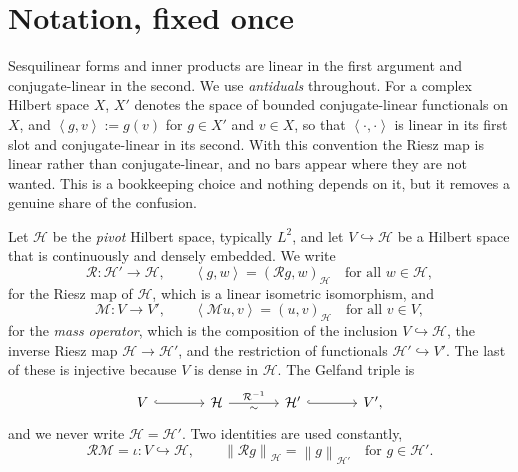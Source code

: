 \documentclass[11pt,a4paper]{article}
\theoremstyle{plain}
\newcommand{\norm}[1]{\left\|#1\right\|}
\newcommand{\dual}[2]{\left\langle #1, #2 \right\rangle}
\newcommand{\Hb}{\mathcal{H}}
\newcommand{\Vb}{V}
\newcommand{\Riesz}{\mathcal{R}}         %
\newcommand{\Mass}{\mathcal{M}}          %
\begin{document}
\section{Notation, fixed once}
\label{sec:notation}

Sesquilinear forms and inner products are linear in the first argument and
conjugate-linear in the second.  We use \emph{antiduals} throughout.  For a
complex Hilbert space $X$, $X'$ denotes the space of bounded conjugate-linear
functionals on $X$, and $\dual{g}{v} := g(v)$ for $g \in X'$ and $v \in X$, so
that $\dual{\cdot}{\cdot}$ is linear in its first slot and conjugate-linear in
its second.  With this convention the Riesz map is linear rather than
conjugate-linear, and no bars appear where they are not wanted.  This is a
bookkeeping choice and nothing depends on it, but it removes a genuine share of
the confusion.

Let $\Hb$ be the \emph{pivot} Hilbert space, typically $L^2$, and let $\Vb
\hookrightarrow \Hb$ be a Hilbert space that is continuously and densely
embedded.  We write
\begin{equation}
  \label{eq:riesz}
  \Riesz \colon \Hb' \to \Hb, \qquad \dual{g}{w} = (\Riesz g, w)_{\Hb}
  \quad \text{for all } w \in \Hb,
\end{equation}
for the Riesz map of $\Hb$, which is a linear isometric isomorphism, and
\begin{equation}
  \label{eq:mass}
  \Mass \colon \Vb \to \Vb', \qquad \dual{\Mass u}{v} = (u,v)_{\Hb}
  \quad \text{for all } v \in \Vb,
\end{equation}
for the \emph{mass operator}, which is the composition of the inclusion $\Vb
\hookrightarrow \Hb$, the inverse Riesz map $\Hb \to \Hb'$, and the restriction
of functionals $\Hb' \hookrightarrow \Vb'$.  The last of these is injective
because $\Vb$ is dense in $\Hb$.  The Gelfand triple is
\begin{equation}
  \label{eq:gelfand}
  \begin{tikzcd}[column sep=large]
    \Vb \arrow[r, hook] & \Hb \arrow[r, "\Riesz^{-1}", "\sim"'] & \Hb'
    \arrow[r, hook] & \Vb',
  \end{tikzcd}
\end{equation}
and we never write $\Hb = \Hb'$.  Two identities are used constantly,
\begin{equation}
  \label{eq:RM}
  \Riesz \Mass = \iota \colon \Vb \hookrightarrow \Hb, \qquad
  \norm{\Riesz g}_{\Hb} = \norm{g}_{\Hb'} \quad \text{for } g \in \Hb'.
\end{equation}
\end{document}
